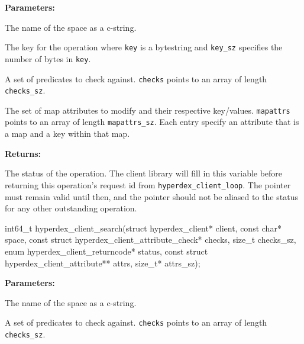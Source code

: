 \noindent\textbf{Parameters:}
\begin{description}[labelindent=\widthof{{\texttt{mapattrs}, \texttt{mapattrs\_sz}}},leftmargin=*,noitemsep,nolistsep,align=right]
\item[\texttt{space}] The name of the space as a c-string.
\item[\texttt{key}, \texttt{key\_sz}] The key for the operation where \texttt{key} is a bytestring and \texttt{key\_sz} specifies the number of bytes in \texttt{key}.
\item[\texttt{checks}, \texttt{checks\_sz}] A set of predicates to check against.  \texttt{checks} points to an array of length \texttt{checks\_sz}.
\item[\texttt{mapattrs}, \texttt{mapattrs\_sz}] The set of map attributes to modify and their respective key/values.  \texttt{mapattrs} points to an array of length \texttt{mapattrs\_sz}.  Each entry specify an attribute that is a map and a key within that map.
\end{description}

\noindent\textbf{Returns:}
\begin{description}[labelindent=\widthof{{\texttt{status}}},leftmargin=*,noitemsep,nolistsep,align=right]
\item[\texttt{status}] The status of the operation.  The client library will fill in this variable before returning this operation's request id from \texttt{hyperdex\_client\_loop}.  The pointer must remain valid until then, and the pointer should not be aliased to the status for any other outstanding operation.
\end{description}

\funcsep
\begin{ccode}
int64_t hyperdex_client_search(struct hyperdex_client* client,
                const char* space,
                const struct hyperdex_client_attribute_check* checks, size_t checks_sz,
                enum hyperdex_client_returncode* status,
                const struct hyperdex_client_attribute** attrs, size_t* attrs_sz);
\end{ccode}
\funcdesc 

\noindent\textbf{Parameters:}
\begin{description}[labelindent=\widthof{{\texttt{checks}, \texttt{checks\_sz}}},leftmargin=*,noitemsep,nolistsep,align=right]
\item[\texttt{space}] The name of the space as a c-string.
\item[\texttt{checks}, \texttt{checks\_sz}] A set of predicates to check against.  \texttt{checks} points to an array of length \texttt{checks\_sz}.
\end{description}


